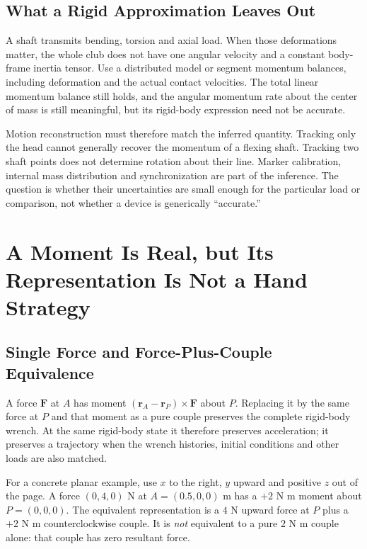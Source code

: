 \documentclass[11pt,a4paper]{article}
\newcommand{\vect}[1]{\boldsymbol{#1}}
\begin{document}
\subsection{What a Rigid Approximation Leaves Out}
A shaft transmits bending, torsion and axial load. When those deformations matter, the whole club does not have one angular velocity and a constant body-frame inertia tensor. Use a distributed model or segment momentum balances, including deformation and the actual contact velocities. The total linear momentum balance still holds, and the angular momentum rate about the center of mass is still meaningful, but its rigid-body expression need not be accurate.

Motion reconstruction must therefore match the inferred quantity. Tracking only the head cannot generally recover the momentum of a flexing shaft. Tracking two shaft points does not determine rotation about their line. Marker calibration, internal mass distribution and synchronization are part of the inference. The question is whether their uncertainties are small enough for the particular load or comparison, not whether a device is generically ``accurate.''

\section{A Moment Is Real, but Its Representation Is Not a Hand Strategy}
\subsection{Single Force and Force-Plus-Couple Equivalence}
A force $\vect F$ at $A$ has moment $(\vect r_A-\vect r_P)\times\vect F$ about $P$. Replacing it by the same force at $P$ and that moment as a pure couple preserves the complete rigid-body wrench. At the same rigid-body state it therefore preserves acceleration; it preserves a trajectory when the wrench histories, initial conditions and other loads are also matched.

For a concrete planar example, use $x$ to the right, $y$ upward and positive $z$ out of the page. A force $(0,4,0)$ N at $A=(0.5,0,0)$ m has a $+2$ N m moment about $P=(0,0,0)$. The equivalent representation is a $4$ N upward force at $P$ plus a $+2$ N m counterclockwise couple. It is \emph{not} equivalent to a pure $2$ N m couple alone: that couple has zero resultant force.
\end{document}
